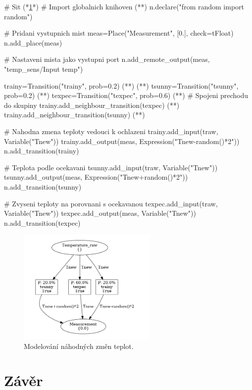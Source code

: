\begin{python}
 # Sit (*\ref{prob-ev-viz}*)
 # Import globalnich knihoven (*\label{code:prob-ev-draw}*)
 n.declare("from random import random")

 # Pridani vystupnich mist
 meas=Place("Measurement", [0.], check=tFloat)
 n.add_place(meas)

 # Nastaveni mista jako vystupni port
 n.add_remote_output(meas, "temp_sens/Input temp")

 trainy=Transition("trainy", prob=0.2) (*\label{code:prob-temp-example}*) (*\label{code:trainy}*)
 tsunny=Transition("tsunny", prob=0.2) (*\label{code:tsunny}*)
 texpec=Transition("texpec", prob=0.6) (*\label{code:texpec}*)
 # Spojeni prechodu do skupiny
 trainy.add_neighbour_transition(texpec) (*\label{code:prob-temp-neghb-example-1}*)
 trainy.add_neighbour_transition(tsunny) (*\label{code:prob-temp-neghb-example-2}*)

 # Nahodna zmena teploty vedouci k ochlazeni
 trainy.add_input(traw, Variable("Tnew"))
 trainy.add_output(meas, Expression("Tnew-random()*2"))
 n.add_transition(trainy)

 # Teplota podle ocekavani
 tsunny.add_input(traw, Variable("Tnew"))
 tsunny.add_output(meas, Expression("Tnew+random()*2"))
 n.add_transition(tsunny)

 # Zvyseni teploty na porovnani s ocekavanou
 texpec.add_input(traw, Variable("Tnew"))
 texpec.add_output(meas, Variable("Tnew"))
 n.add_transition(texpec)
\end{python}

\begin{figure}[htb]
 \centering
 \includegraphics[width=0.6\textwidth]{obrazky-figures/measure.png}
 \caption{Modelování náhodných změn teplot.}
 \label{prob-ev-viz}
\end{figure}

\chapter{Závěr}
\label{chap:zaver}

